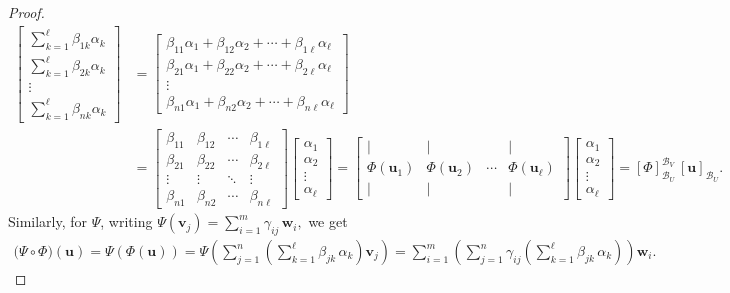 \documentclass[11pt,openany]{article}
\renewcommand{\vec}[1]{\mathbf{#1}}
\begin{document}
\begin{observation}
\begin{proof}
\begin{align*} [\Phi(\vec{u})]
\begin{bmatrix}
	\sum_{k=1}^\ell \beta_{1k}\alpha_k \\
	\sum_{k=1}^\ell \beta_{2k}\alpha_k \\
	\vdots \\
	\sum_{k=1}^\ell \beta_{n k}\alpha_k
\end{bmatrix}&=\begin{bmatrix}
\beta_{11}\alpha_1+\beta_{12}\alpha_2+\cdots+\beta_{1\ell}\alpha_\ell \\
\beta_{21}\alpha_1+\beta_{22}\alpha_2+\cdots+\beta_{2\ell}\alpha_\ell \\
\vdots \\
\beta_{n1}\alpha_1+\beta_{n2}\alpha_2+\cdots+\beta_{n\ell}\alpha_\ell
\end{bmatrix} \\
&=\begin{bmatrix}
	\beta_{11} & \beta_{12} & \cdots &\beta_{1\ell} \\
	\beta_{21} & \beta_{22} & \cdots &\beta_{2\ell}\\
	\vdots & \vdots & \ddots &\vdots \\
	\beta_{n1} & \beta_{n2} & \cdots & \beta_{n\ell}
\end{bmatrix}\begin{bmatrix}
\alpha_1 \\ \alpha_2 \\ \vdots \\ \alpha_\ell
\end{bmatrix}=\begin{bmatrix}
	\mid & \mid & & \mid \\
\Phi(\vec{u}_1) &\Phi(\vec{u}_2) & \cdots & \Phi(\vec{u}_\ell) \\
\mid & \mid & & \mid
\end{bmatrix}\begin{bmatrix}
\alpha_1 \\ \alpha_2 \\ \vdots \\ \alpha_\ell
\end{bmatrix}= [\Phi]_{\mathcal{B}_U}^{\mathcal{B}_V}\,[\vec{u}]_{\mathcal{B}_U}.
\end{align*}
Similarly, for \(\Psi\), writing $
\Psi(\vec{v}_j) = \sum_{i=1}^{m} \gamma_{ij}\, \vec{w}_i,$ we get
\begin{align*}
\bigl(\Psi\circ\Phi\bigr)(\vec{u})=\Psi\left(\Phi(\vec{u})\right) =\Psi\left(\sum_{j=1}^{n} \left( \sum_{k=1}^{\ell} \beta_{jk}\,\alpha_k\right)\vec{v}_j\right)=\sum_{i=1}^{m}\left(\sum_{j=1}^{n} \gamma_{ij} \left(\sum_{k=1}^{\ell} \beta_{jk}\,\alpha_k\right)\right)\vec{w}_i.

\end{align*}
\end{proof}
\end{observation}
\end{document}
